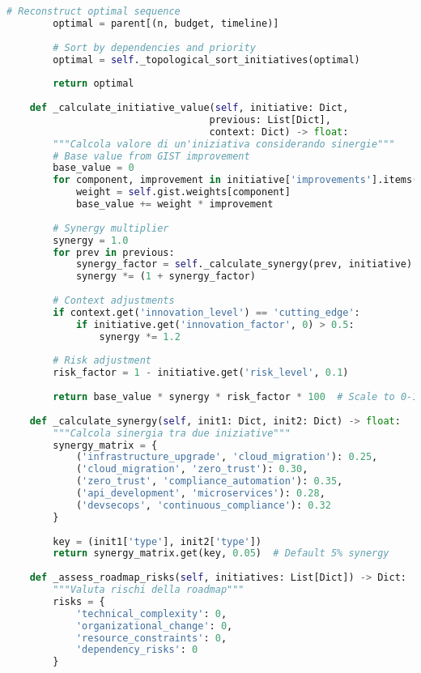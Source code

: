 \begin{lstlisting}[language=Python, caption=Generazione Roadmap Ottimizzata GIST]
        # Reconstruct optimal sequence
        optimal = parent[(n, budget, timeline)]
        
        # Sort by dependencies and priority
        optimal = self._topological_sort_initiatives(optimal)
        
        return optimal
    
    def _calculate_initiative_value(self, initiative: Dict, 
                                   previous: List[Dict], 
                                   context: Dict) -> float:
        """Calcola valore di un'iniziativa considerando sinergie"""
        # Base value from GIST improvement
        base_value = 0
        for component, improvement in initiative['improvements'].items():
            weight = self.gist.weights[component]
            base_value += weight * improvement
        
        # Synergy multiplier
        synergy = 1.0
        for prev in previous:
            synergy_factor = self._calculate_synergy(prev, initiative)
            synergy *= (1 + synergy_factor)
        
        # Context adjustments
        if context.get('innovation_level') == 'cutting_edge':
            if initiative.get('innovation_factor', 0) > 0.5:
                synergy *= 1.2
        
        # Risk adjustment
        risk_factor = 1 - initiative.get('risk_level', 0.1)
        
        return base_value * synergy * risk_factor * 100  # Scale to 0-100
    
    def _calculate_synergy(self, init1: Dict, init2: Dict) -> float:
        """Calcola sinergia tra due iniziative"""
        synergy_matrix = {
            ('infrastructure_upgrade', 'cloud_migration'): 0.25,
            ('cloud_migration', 'zero_trust'): 0.30,
            ('zero_trust', 'compliance_automation'): 0.35,
            ('api_development', 'microservices'): 0.28,
            ('devsecops', 'continuous_compliance'): 0.32
        }
        
        key = (init1['type'], init2['type'])
        return synergy_matrix.get(key, 0.05)  # Default 5% synergy
    
    def _assess_roadmap_risks(self, initiatives: List[Dict]) -> Dict:
        """Valuta rischi della roadmap"""
        risks = {
            'technical_complexity': 0,
            'organizational_change': 0,
            'resource_constraints': 0,
            'dependency_risks': 0
        }
        

\end{lstlisting}
